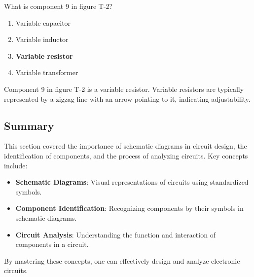\begin{tcolorbox}[colback=gray!10!white,colframe=black!75!black,title={T6C08}]
    What is component 9 in figure T-2?
    \begin{enumerate}[label=\Alph*),noitemsep]
        \item Variable capacitor
        \item Variable inductor
        \item \textbf{Variable resistor}
        \item Variable transformer
    \end{enumerate}
\end{tcolorbox}
Component 9 in figure T-2 is a variable resistor. Variable resistors are typically represented by a zigzag line with an arrow pointing to it, indicating adjustability.


\subsection*{Summary}
This section covered the importance of schematic diagrams in circuit design, the identification of components, and the process of analyzing circuits. Key concepts include:

\begin{itemize}
    \item \textbf{Schematic Diagrams}: Visual representations of circuits using standardized symbols.
    \item \textbf{Component Identification}: Recognizing components by their symbols in schematic diagrams.
    \item \textbf{Circuit Analysis}: Understanding the function and interaction of components in a circuit.
\end{itemize}

By mastering these concepts, one can effectively design and analyze electronic circuits.
